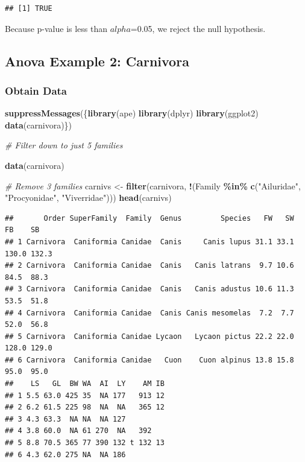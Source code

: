 \documentclass[
]{article}
\newenvironment{Shaded}{\begin{snugshade}}{\end{snugshade}}
\newcommand{\CommentTok}[1]{\textcolor[rgb]{0.56,0.35,0.01}{\textit{#1}}}
\newcommand{\FunctionTok}[1]{\textcolor[rgb]{0.13,0.29,0.53}{\textbf{#1}}}
\newcommand{\NormalTok}[1]{#1}
\newcommand{\OtherTok}[1]{\textcolor[rgb]{0.56,0.35,0.01}{#1}}
\newcommand{\SpecialCharTok}[1]{\textcolor[rgb]{0.81,0.36,0.00}{\textbf{#1}}}
\newcommand{\StringTok}[1]{\textcolor[rgb]{0.31,0.60,0.02}{#1}}
\begin{document}
\begin{verbatim}
## [1] TRUE
\end{verbatim}

Because p-value is less than \(alpha\)=0.05, we reject the null
hypothesis.

\subsection{Anova Example 2: Carnivora}\label{anova-example-2-carnivora}

\subsubsection{Obtain Data}\label{obtain-data}

\begin{Shaded}
\begin{Highlighting}[]
\FunctionTok{suppressMessages}\NormalTok{(\{}\FunctionTok{library}\NormalTok{(ape)}
\FunctionTok{library}\NormalTok{(dplyr)}
\FunctionTok{library}\NormalTok{(ggplot2)}
\FunctionTok{data}\NormalTok{(carnivora)\})}
\end{Highlighting}
\end{Shaded}

\begin{Shaded}
\begin{Highlighting}[]
\CommentTok{\# Filter down to just 5 families}

\FunctionTok{data}\NormalTok{(carnivora)}

\CommentTok{\# Remove 3 families}
\NormalTok{carnivs }\OtherTok{\textless{}{-}} \FunctionTok{filter}\NormalTok{(carnivora,}
\SpecialCharTok{!}\NormalTok{(Family }\SpecialCharTok{\%in\%} \FunctionTok{c}\NormalTok{(}\StringTok{"Ailuridae"}\NormalTok{,}
\StringTok{"Procyonidae"}\NormalTok{,}
\StringTok{"Viverridae"}\NormalTok{)))}
\FunctionTok{head}\NormalTok{(carnivs)}
\end{Highlighting}
\end{Shaded}

\begin{verbatim}
##       Order SuperFamily  Family  Genus         Species   FW   SW    FB    SB
## 1 Carnivora  Caniformia Canidae  Canis     Canis lupus 31.1 33.1 130.0 132.3
## 2 Carnivora  Caniformia Canidae  Canis   Canis latrans  9.7 10.6  84.5  88.3
## 3 Carnivora  Caniformia Canidae  Canis   Canis adustus 10.6 11.3  53.5  51.8
## 4 Carnivora  Caniformia Canidae  Canis Canis mesomelas  7.2  7.7  52.0  56.8
## 5 Carnivora  Caniformia Canidae Lycaon   Lycaon pictus 22.2 22.0 128.0 129.0
## 6 Carnivora  Caniformia Canidae   Cuon    Cuon alpinus 13.8 15.8  95.0  95.0
##    LS   GL  BW WA  AI  LY    AM IB
## 1 5.5 63.0 425 35  NA 177   913 12
## 2 6.2 61.5 225 98  NA  NA   365 12
## 3 4.3 63.3  NA NA  NA 127         
## 4 3.8 60.0  NA 61 270  NA   392   
## 5 8.8 70.5 365 77 390 132 t 132 13
## 6 4.3 62.0 275 NA  NA 186
\end{verbatim}
\end{document}
